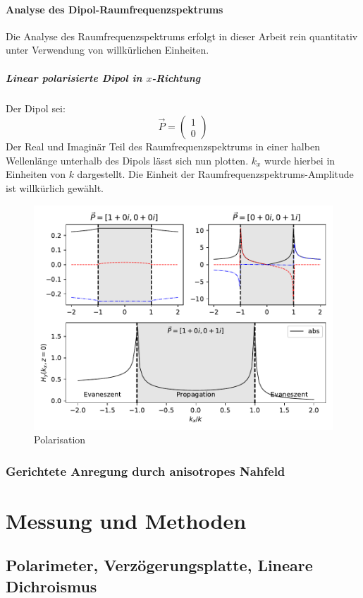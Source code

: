 \documentclass{article}
\begin{document}
	\paragraph{Analyse des Dipol-Raumfrequenzspektrums}
		Die Analyse des Raumfrequenzspektrums erfolgt in dieser Arbeit rein quantitativ unter Verwendung von willkürlichen Einheiten.
		\subparagraph{Linear polarisierte Dipol in $x$-Richtung}
			Der Dipol sei:
			 $$\vec{P} = \begin{pmatrix} 1 \\ 0\end{pmatrix}$$
			Der Real und Imaginär Teil des Raumfrequenzspektrums in einer halben Wellenlänge unterhalb des Dipols lässt sich nun plotten. $k_x$ wurde hierbei in Einheiten von $k$ dargestellt. Die Einheit der Raumfrequenzspektrums-Amplitude ist willkürlich gewählt.
		\begin{figure}[htbp] 
			\centering
			\includegraphics[width=\textwidth]{figures/spatial_spectrum_dipol.pdf}
			\caption{Polarisation}
			\label{fig:polarimeter}
		\end{figure}
	\subsubsection{Gerichtete Anregung durch anisotropes Nahfeld}	
\section{Messung und Methoden}
\subsection{Polarimeter, Verzögerungsplatte, Lineare Dichroismus}
\end{document}
